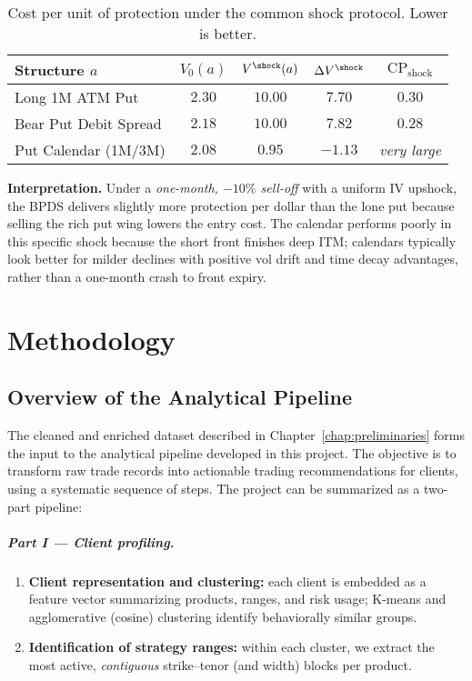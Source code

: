 \documentclass[12pt,a4paper]{report}
\begin{document}
\begin{table}[h]
\centering
\begin{tabular}{lcccc}
\toprule
\textbf{Structure $a$} & $V_0(a)$ & $V^{\shock}(a)$ & $\Delta V^{\shock}$ & $\mathrm{CP}_{\text{shock}}$ \\
\midrule
Long 1M ATM Put      & $2.30$ & $10.00$ & $7.70$  & $\mathbf{0.30}$ \\
Bear Put Debit Spread& $2.18$ & $10.00$ & $7.82$  & $\mathbf{0.28}$ \\
Put Calendar (1M/3M) & $2.08$ & $0.95$  & $-1.13$ & \textit{very large} \\
\bottomrule
\end{tabular}
\caption{Cost per unit of protection under the common shock protocol. Lower is better.}
\end{table}

\noindent\textbf{Interpretation.}
Under a \emph{one-month, $-10\%$ sell-off} with a uniform IV upshock, the BPDS delivers slightly more protection per dollar than the lone put because selling the rich put wing lowers the entry cost. The calendar performs poorly in this specific shock because the short front finishes deep ITM; calendars typically look better for milder declines with positive vol drift and time decay advantages, rather than a one-month crash to front expiry.



\chapter{Methodology}

\section{Overview of the Analytical Pipeline}

The cleaned and enriched dataset described in Chapter~\ref{chap:preliminaries} forms the input to the analytical pipeline developed in this project. The objective is to transform raw trade records into actionable trading recommendations for clients, using a systematic sequence of steps. The project can be summarized as a two-part pipeline:

\paragraph{Part I — Client profiling.}
\begin{enumerate}
    \item \textbf{Client representation and clustering:} each client is embedded as a feature vector summarizing products, ranges, and risk usage; K-means and agglomerative (cosine) clustering identify behaviorally similar groups.
    \item \textbf{Identification of strategy ranges:} within each cluster, we extract the most active, \emph{contiguous} strike–tenor (and width) blocks per product.

\end{enumerate}
\end{document}
